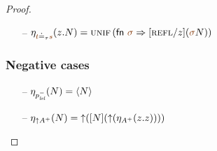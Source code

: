\begin{proof}
\begin{itemize}


\item[--] $\etapa{z}{N}{\lf{t} \doteq_\tau \lf{s}} 
           = \textsc{unif}\,({\sf fn}~ \lf\sigma \Rightarrow [\tunifr/z](\lf\sigma{N}))$



\end{itemize}

\subsubsection{Negative cases}

\begin{itemize}
\item[--] $\etana{N}{p^-_\mlvl} = \tetan{N}$
\item[--] $\etana{N}{{\uparrow}A^+} 
           = \tupr{([N](\tupl{(\etapa{z}{\tfocusr{z}}{A^+})}))}$



\end{itemize}
\end{proof}
